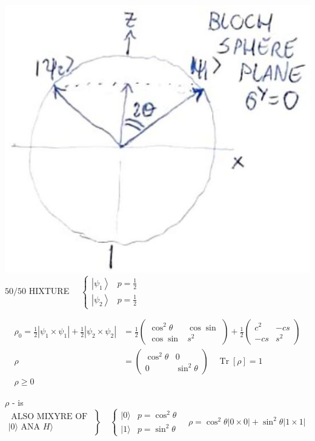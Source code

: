 \documentclass[10pt]{article}
\begin{document}
\includegraphics[max width=\textwidth, center]{2025_10_16_1bd50d0393172dac5e59g-02}\\
$50 / 50$ HIXTURE $\quad \begin{cases}\left|\psi_{1}\right\rangle & p=\frac{1}{2} \\ \left|\psi_{2}\right\rangle & p=\frac{1}{2}\end{cases}$

$$
\begin{aligned}
\rho_{0}=\frac{1}{2}\left|\psi_{1} \times \psi_{1}\right|+\frac{1}{2}\left|\psi_{2} \times \psi_{2}\right| & =\frac{1}{2}\left(\begin{array}{cc}
\cos ^{2} \theta & \cos \sin \\
\cos \sin & s^{2}
\end{array}\right)+\frac{1}{2}\left(\begin{array}{cc}
c^{2} & -c s \\
-c s & s^{2}
\end{array}\right) \\
\rho & =\left(\begin{array}{cc}
\cos ^{2} \theta & 0 \\
0 & \sin ^{2} \theta
\end{array}\right) \quad \operatorname{Tr}[\rho]=1 \\
\rho \geqslant 0 &
\end{aligned}
$$

$\rho$ - is $\left.\begin{array}{l}\text { ALSO MIXYRE OF } \\ |0\rangle \text { ANA } H\rangle\end{array}\right\} \quad\left\{\begin{array}{ll}|0\rangle & p=\cos ^{2} \theta \\ |1\rangle & p=\sin ^{2} \theta\end{array} \quad \rho=\cos ^{2} \theta|0 \times 0|+\sin ^{2} \theta|1 \times 1|\right.$
\end{document}
